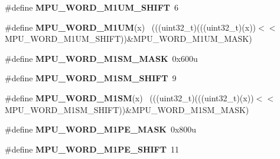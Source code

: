 \begin{DoxyCompactItemize}
\item 
\hypertarget{group___m_p_u___register___masks_gaddd6babdd00ce10ca794e6fb8b49c1a8}{}\#define {\bfseries M\+P\+U\+\_\+\+W\+O\+R\+D\+\_\+\+M1\+U\+M\+\_\+\+S\+H\+I\+F\+T}~6\label{group___m_p_u___register___masks_gaddd6babdd00ce10ca794e6fb8b49c1a8}

\item 
\hypertarget{group___m_p_u___register___masks_gae11f573fe800b2d63444a84c207f84e2}{}\#define {\bfseries M\+P\+U\+\_\+\+W\+O\+R\+D\+\_\+\+M1\+U\+M}(x)                                              ~(((uint32\+\_\+t)(((uint32\+\_\+t)(x))$<$$<$M\+P\+U\+\_\+\+W\+O\+R\+D\+\_\+\+M1\+U\+M\+\_\+\+S\+H\+I\+F\+T))\&M\+P\+U\+\_\+\+W\+O\+R\+D\+\_\+\+M1\+U\+M\+\_\+\+M\+A\+S\+K)\label{group___m_p_u___register___masks_gae11f573fe800b2d63444a84c207f84e2}

\item 
\hypertarget{group___m_p_u___register___masks_ga693c293e0d79e4e10f3e2c955a07afaf}{}\#define {\bfseries M\+P\+U\+\_\+\+W\+O\+R\+D\+\_\+\+M1\+S\+M\+\_\+\+M\+A\+S\+K}~0x600u\label{group___m_p_u___register___masks_ga693c293e0d79e4e10f3e2c955a07afaf}

\item 
\hypertarget{group___m_p_u___register___masks_ga41b28fc0062d523a3f560d2362a1505b}{}\#define {\bfseries M\+P\+U\+\_\+\+W\+O\+R\+D\+\_\+\+M1\+S\+M\+\_\+\+S\+H\+I\+F\+T}~9\label{group___m_p_u___register___masks_ga41b28fc0062d523a3f560d2362a1505b}

\item 
\hypertarget{group___m_p_u___register___masks_gae178cca964045d76f0534d075cf0455e}{}\#define {\bfseries M\+P\+U\+\_\+\+W\+O\+R\+D\+\_\+\+M1\+S\+M}(x)                                              ~(((uint32\+\_\+t)(((uint32\+\_\+t)(x))$<$$<$M\+P\+U\+\_\+\+W\+O\+R\+D\+\_\+\+M1\+S\+M\+\_\+\+S\+H\+I\+F\+T))\&M\+P\+U\+\_\+\+W\+O\+R\+D\+\_\+\+M1\+S\+M\+\_\+\+M\+A\+S\+K)\label{group___m_p_u___register___masks_gae178cca964045d76f0534d075cf0455e}

\item 
\hypertarget{group___m_p_u___register___masks_ga94b4a665c530cd24d0c50f3f2492fe76}{}\#define {\bfseries M\+P\+U\+\_\+\+W\+O\+R\+D\+\_\+\+M1\+P\+E\+\_\+\+M\+A\+S\+K}~0x800u\label{group___m_p_u___register___masks_ga94b4a665c530cd24d0c50f3f2492fe76}

\item 
\hypertarget{group___m_p_u___register___masks_ga55fd259e384eb99bec87cf114513e009}{}\#define {\bfseries M\+P\+U\+\_\+\+W\+O\+R\+D\+\_\+\+M1\+P\+E\+\_\+\+S\+H\+I\+F\+T}~11\label{group___m_p_u___register___masks_ga55fd259e384eb99bec87cf114513e009}


\end{DoxyCompactItemize}

